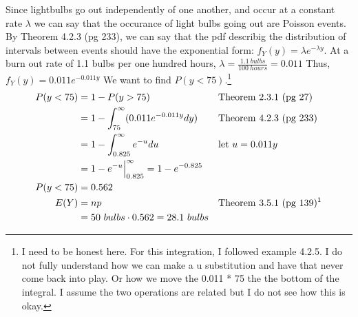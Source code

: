 \documentclass[12pt]{article}
\newenvironment{problem}[2][Problem]{\begin{trivlist}
\item[\hskip \labelsep {\bfseries #1}\hskip \labelsep {\bfseries #2.}]}{\end{trivlist}}
\begin{document}
\begin{problem}{4.2.28}
Since lightbulbs go out independently of one another, and occur at a constant rate $\lambda $ we can say that the occurance of light bulbs going out are Poisson events. By Theorem 4.2.3 (pg 233), we can say that the pdf describig the distribution of intervals between events should have the exponential form: $f_Y(y) = \lambda e^{-\lambda y}$. At a burn out rate of 1.1 bulbs per one hundred hours, $\lambda = \frac{1.1 \ bulbs}{100 \ hours}= 0.011$ Thus, $f_Y(y) = 0.011 e^{-0.011 y}$ We want to find $P(y < 75)$.\footnote{I need to be honest here. For this integration, I followed example 4.2.5. I do not fully understand how we can make a u substitution and have that never come back into play. Or how we move the 0.011 * 75 the the bottom of the integral. I assume the two operations are related but I do not see how this is okay.} 
\begin{align*}
P(y<75) &= 1- P(y>75) && \text{Theorem 2.3.1 (pg 27)} \\
&= 1 - \int_{75}^{\infty}( 0.011 e^{-0.011 y}dy) && \text{Theorem 4.2.3 (pg 233)} \\
&= 1 - \int_{0.825}^{\infty}e^{-u}du && \text{let $u = 0.011y$} \\
&=1 -e^{-u}\Big|_{0.825}^{\infty} = 1 - e^{-0.825} \\
P(y<75) &= 0.562 \\
E(Y) &= np && \text{Theorem 3.5.1 (pg 139)\footnotemark} \\
&=50 \ bulbs \cdot 0.562 = 28.1 \ bulbs
\end{align*}
\end{problem}
 \newpage
\end{document}
